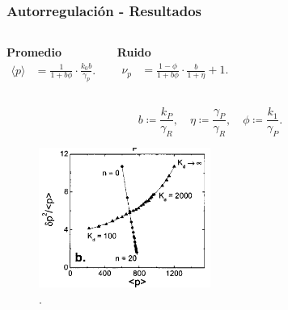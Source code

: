 \documentclass{beamer}
\begin{document}
\begin{frame}
\frametitle{Autorregulaci\'on - Resultados}
\begin{columns}[c]

\centering \textbf{Promedio}
\begin{align*}
\langle p \rangle &= \frac{1}{1+b\phi} \cdot \frac{k_0b}{\gamma_p}.
\end{align*}

\centering \textbf{Ruido}
\begin{align*}
\nu_p &= \frac{1-\phi}{1+b\phi} \cdot \frac{b}{1+\eta}+1.
\end{align*}
\end{columns}

\vspace{3 mm}

\begin{equation*}
  b \coloneqq \frac{k_P}{\gamma_R}, \quad \eta \coloneqq \frac{\gamma_P}{\gamma_R}, \quad \phi \coloneqq \frac{k_1}{\gamma_P}.
\end{equation*}

\begin{figure}[p]
    \centering
    \includegraphics[width=0.5\textwidth]{graph5.png}\\
    \tiny \cite{p1}.
\end{figure}

\end{frame}
\end{document}
